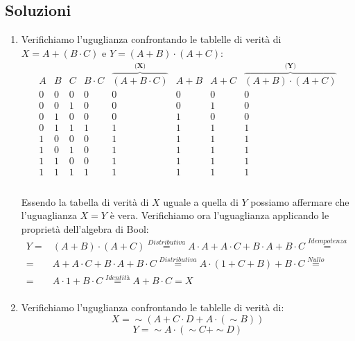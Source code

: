 \documentclass[tikz, border=2mm]{article}
\begin{document}
\subsection{Soluzioni}
\begin{enumerate}
    \item Verifichiamo l'uguglianza confrontando le tablelle di verità di $X=A+(B\cdot C)$ e $Y=(A+B)\cdot(A+C)$:
    \begin{equation*}
        \begin{array}{C|C|C||C|C|C|C|C}
        A & B & C & B\cdot C & \overbrace{(A+B\cdot C)}^{\textbf{(X)}} & A+B & A+C & \overbrace{(A+B)\cdot (A+C)}^{\textbf{(Y)}} \\
        \hline
        0 & 0 & 0 & 0 & 0 & 0 & 0 & 0\\
        0 & 0 & 1 & 0 & 0 & 0 & 1 & 0\\
        0 & 1 & 0 & 0 & 0 & 1 & 0 & 0\\
        0 & 1 & 1 & 1 & 1 & 1 & 1 & 1\\
        1 & 0 & 0 & 0 & 1 & 1 & 1 & 1\\
        1 & 0 & 1 & 0 & 1 & 1 & 1 & 1\\
        1 & 1 & 0 & 0 & 1 & 1 & 1 & 1\\
        1 & 1 & 1 & 1 & 1 & 1 & 1 & 1\\
        
        \end{array}
    \end{equation*}
    \\
    Essendo la tabella di verità di $X$ uguale a quella di $Y$ possiamo affermare che l'uguaglianza $X=Y$ \`e vera.
    Verifichiamo ora l'uguaglianza applicando le propriet\`a dell'algebra di Bool:
    \begin{equation*}
    \begin{aligned}
        Y ={} & (A+B)\cdot(A+C) \overset{Distributiva}{=} A\cdot A+A\cdot C+B\cdot A+B\cdot C\overset{Idempotenza}{=} \\
             = &  A+A\cdot C+B\cdot A+B\cdot C \overset{Distributiva}{=} A\cdot(1+C+B)+B\cdot C\overset{Nullo}{=}\\
             = & A\cdot 1+B\cdot C\overset{Identità}{=}A+B\cdot C=X\\
    \end{aligned}
    \end{equation*}
    
    \newpage
    
    \item Verifichiamo l'uguglianza confrontando le tablelle di verità di:
    $$X=\sim (A+C \cdot D+A \cdot ( \sim B))$$
    $$Y= \sim A \cdot ( \sim C+ \sim D)$$
    

\end{enumerate}
\end{document}
